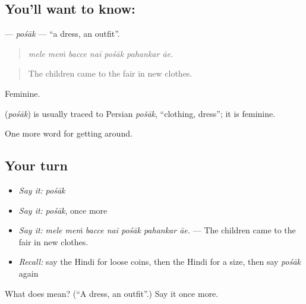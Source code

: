 \subsection*{You'll want to know: }
\textbf{} — \emph{pośāk} — \textquotedblleft{}a dress, an outfit\textquotedblright{}.

\begin{quote}
      
\end{quote}

\begin{quote}
\emph{mele meṁ bacce naī pośāk pahankar āe.}
\end{quote}

\begin{quote}
The children came to the fair in new clothes.
\end{quote}

Feminine.

\begin{cousinweb}
\textbf{} (\emph{pośāk}) is usually traced to Persian \emph{pošāk}, \textquotedblleft{}clothing, dress\textquotedblright{}; it is feminine.
\end{cousinweb}

\begin{grammarlens}[title={What you've built}]
One more word for getting around.
\end{grammarlens}

\subsection*{Your turn}
\begin{itemize}
\raggedright
  \item \emph{Say it:} \emph{pośāk}
  \item \emph{Say it:} \emph{pośāk}, once more
  \item \emph{Say it:} \emph{mele meṁ bacce naī pośāk pahankar āe.} — The children came to the fair in new clothes.
  \item \emph{Recall:} say the Hindi for loose coins, then the Hindi for a size, then say \emph{pośāk} again
\end{itemize}

\begin{tcolorbox}[breakable,colback=teal!4,colframe=teal!35!black,title={Before you move on}]
What does  mean? (\textquotedblleft{}A dress, an outfit\textquotedblright{}.) Say it once more.
\end{tcolorbox}
